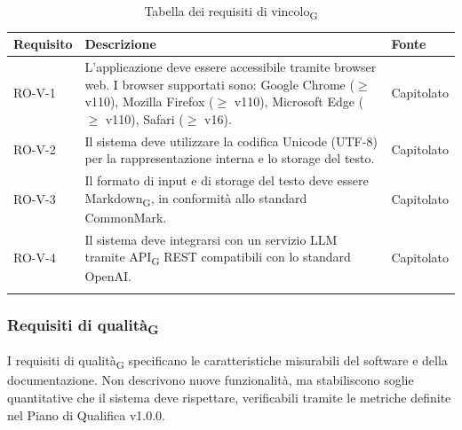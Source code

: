 \documentclass[11pt,a4paper]{article}
\newcommand{\gls}[1]{#1\textsubscript{G}}
\begin{document}
\begin{longtable}{|p{}|>{
  \raggedright\arraybackslash}p{}|p{}|}
\hline
\textbf{Requisito} & \textbf{Descrizione} & \textbf{Fonte} \\
\hline
RO-V-1 & L'applicazione deve essere accessibile tramite browser web. 
I browser supportati sono: Google Chrome ($\geq$ v110), Mozilla Firefox 
($\geq$ v110), Microsoft Edge ($\geq$ v110), Safari ($\geq$ v16). & Capitolato \\
\hline
RO-V-2 & Il sistema deve utilizzare la codifica Unicode (UTF-8) per la rappresentazione interna e lo storage del testo. & Capitolato \\
\hline
RO-V-3 & Il formato di input e di storage del testo deve essere \gls{Markdown}, in conformità allo standard CommonMark. & Capitolato \\
\hline
RO-V-4 & Il sistema deve integrarsi con un servizio LLM tramite \gls{API} REST compatibili con lo standard OpenAI. & Capitolato \\
\hline
\addlinespace[1em]
\caption{Tabella dei \gls{requisiti di vincolo}}
\end{longtable}

\newpage

\subsubsection{\gls{Requisiti di qualità}}
I \gls{requisiti di qualità} specificano le caratteristiche 
misurabili del software e della documentazione. Non descrivono nuove 
funzionalità, ma stabiliscono soglie quantitative che il sistema deve 
rispettare, verificabili tramite le metriche definite nel 
Piano di Qualifica v1.0.0.
\end{document}
